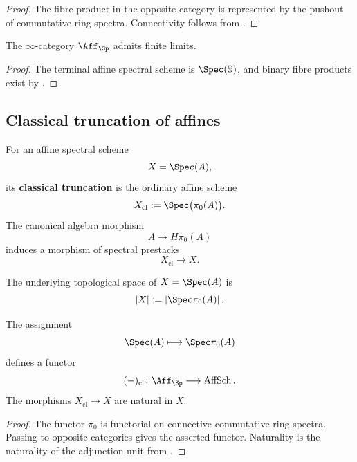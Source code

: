 \begin{proof}
The fibre product in the opposite category is represented by the pushout
of commutative ring spectra. Connectivity follows from
.
\end{proof}

\begin{corollary}
\label{cor:affine-spectral-finite-limits}
The $\infty$-category $\Aff_{\Sp}$ admits finite limits.
\end{corollary}

\begin{proof}
The terminal affine spectral scheme is $\Spec(\mathbb S)$, and binary
fibre products exist by .
\end{proof}

\subsection{Classical truncation of affines}

\begin{definition}
\label{def:classical-truncation-affine}
For an affine spectral scheme
\[
    X=\Spec(A),
\]
its \textbf{classical truncation} is the ordinary affine scheme
\[
    X_{\mathrm{cl}}
    :=
    \Spec\bigl(\pi_0(A)\bigr).
\]
The canonical algebra morphism
\[
    A
    \longrightarrow
    H\pi_0(A)
\]
induces a morphism of spectral prestacks
\[
    X_{\mathrm{cl}}
    \longrightarrow
    X.
\]
\end{definition}

\begin{definition}
\label{def:underlying-topological-space-affine-spectral}
The underlying topological space of $X=\Spec(A)$ is
\[
    |X|
    :=
    \left|\Spec\pi_0(A)\right|.
\]
\end{definition}

\begin{proposition}
\label{prop:affine-classical-truncation-functorial}
The assignment
\[
    \Spec(A)
    \longmapsto
    \Spec\pi_0(A)
\]
defines a functor
\[
    (-)_{\mathrm{cl}}
    \colon
    \Aff_{\Sp}
    \longrightarrow
    \operatorname{AffSch}.
\]
The morphisms $X_{\mathrm{cl}}\to X$ are natural in $X$.
\end{proposition}

\begin{proof}
The functor $\pi_0$ is functorial on connective commutative ring spectra.
Passing to opposite categories gives the asserted functor. Naturality is
the naturality of the adjunction unit from
.
\end{proof}

